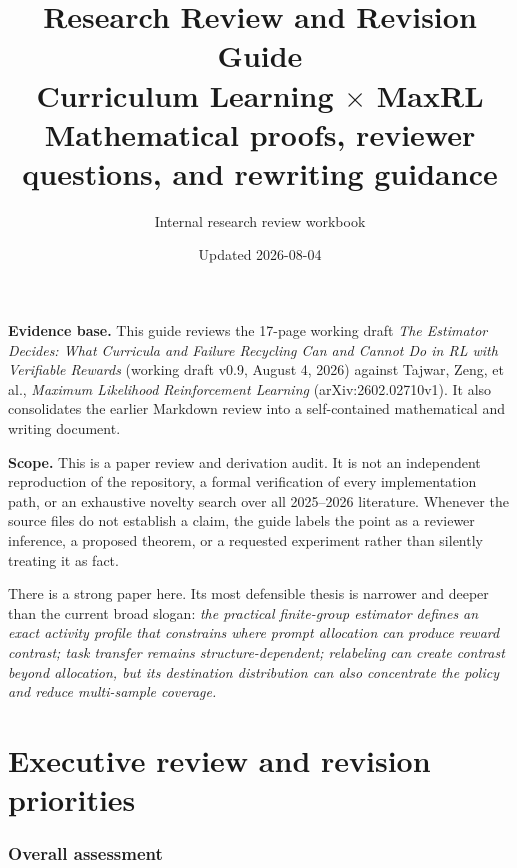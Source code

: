 \documentclass[11pt]{article}
\title{\vspace{-1.3cm}\textbf{Research Review and Revision Guide}\\[0.3em]
\Large Curriculum Learning $\times$ MaxRL\\[0.25em]
\large Mathematical proofs, reviewer questions, and rewriting guidance}
\author{Internal research review workbook}
\date{Updated 2026-08-04}
\theoremstyle{definition}
\theoremstyle{remark}
\begin{document}
\maketitle

\begin{center}
\begin{minipage}{0.92\textwidth}
\small
\textbf{Evidence base.} This guide reviews the 17-page working draft \emph{The Estimator Decides: What Curricula and Failure Recycling Can and Cannot Do in RL with Verifiable Rewards} (working draft v0.9, August 4, 2026) against Tajwar, Zeng, et al., \emph{Maximum Likelihood Reinforcement Learning} (arXiv:2602.02710v1). It also consolidates the earlier Markdown review into a self-contained mathematical and writing document.

\textbf{Scope.} This is a paper review and derivation audit. It is not an independent reproduction of the repository, a formal verification of every implementation path, or an exhaustive novelty search over all 2025--2026 literature. Whenever the source files do not establish a claim, the guide labels the point as a reviewer inference, a proposed theorem, or a requested experiment rather than silently treating it as fact.
\end{minipage}
\end{center}

\vspace{0.5em}
\begin{takeawaybox}
There is a strong paper here. Its most defensible thesis is narrower and deeper than the current broad slogan: \emph{the practical finite-group estimator defines an exact activity profile that constrains where prompt allocation can produce reward contrast; task transfer remains structure-dependent; relabeling can create contrast beyond allocation, but its destination distribution can also concentrate the policy and reduce multi-sample coverage.}
\end{takeawaybox}

\tableofcontents
\newpage

\part{Executive review and revision priorities}

\section{Overall assessment}
\end{document}
